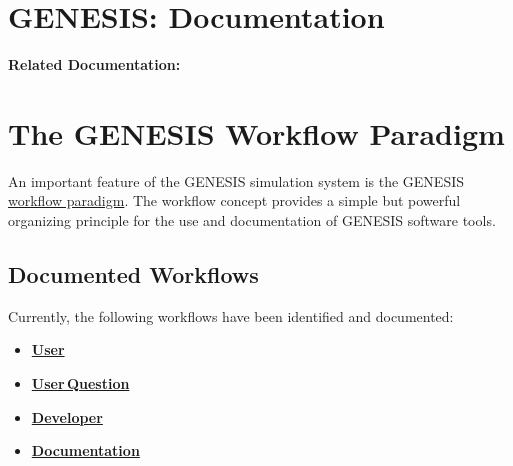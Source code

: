 \documentclass[12pt]{article}
\begin{document}
\section*{GENESIS: Documentation}

{\bf Related Documentation:}

\section*{The GENESIS Workflow Paradigm}

An important feature of the GENESIS simulation system is the GENESIS
\href{http://en.wikipedia.org/wiki/Workflow}{workflow paradigm}. The
workflow concept provides a simple but powerful organizing principle
for the use and documentation of GENESIS software tools.

\subsection*{Documented Workflows}
Currently, the following workflows have been identified and documented:
\begin{itemize}
\item \href{../workflow-user/workflow-user.tex}{\bf User}
\item \href{../workflow-user-query/workflow-user-query.tex}{\bf User\,Question}
\item \href{../workflow-developer/workflow-developer.tex}{\bf Developer}
\item \href{../workflow-documentation/workflow-documentation.tex}{\bf Documentation}
\end{itemize}
\end{document}
